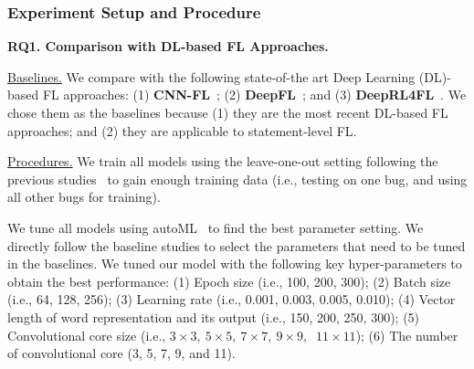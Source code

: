 \subsubsection{Experiment Setup and Procedure\\}

{\bf RQ1. Comparison with DL-based FL Approaches.}

\underline{Baselines.}
We compare {\tool} with the following state-of-the art Deep Learning
(DL)-based FL approaches: (1) \textbf{CNN-FL}~\cite{zhang2019cnn}; (2)
{\bf DeepFL}~\cite{DeepFL}; and (3) {\bf DeepRL4FL}~\cite{icse21-fl}.
We chose them as the baselines because (1) they are the most recent
DL-based FL approaches; and (2) they are applicable to statement-level
FL.


\underline{Procedures.}
We train all models using the leave-one-out setting following the
previous studies~\cite{DeepFL, TraPT} to gain enough training data
(i.e., testing on one bug, and using all other bugs for
training).




We tune all models using autoML~\cite{NNI} to find the best parameter
setting. We directly follow the baseline studies to select the
parameters that need to be tuned in the baselines.
We tuned our model with the following key hyper-parameters to obtain
the best performance: (1) Epoch size (i.e., 100, 200, 300); (2) Batch
size (i.e., 64, 128, 256); (3) Learning rate (i.e., 0.001, 0.003,
0.005, 0.010); (4) Vector length of word representation and its output
(i.e., 150, 200, 250, 300); (5) Convolutional core size (i.e.,
$3\times3,\:5\times5,\:7\times7,\:9\times9,$ $\:11\times11$); (6)
The number of convolutional core (3, 5, 7, 9, and 11).

